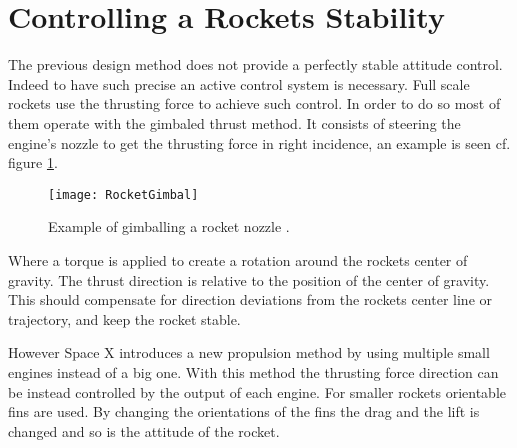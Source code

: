 \section{Controlling a Rockets Stability}
The previous design method does not provide a perfectly stable attitude control. Indeed to have such precise an active control system is necessary. Full scale rockets use the thrusting force to achieve such control. In order to do so most of them operate with the gimbaled thrust method. It consists of steering the engine's nozzle to get the thrusting force in right incidence, an example is seen cf. figure \ref{fig:RocketGimbal}. 
\begin{figure} [htbp]
	\centering
	\texttt{[image: RocketGimbal]}
	\caption{Example of gimballing a rocket nozzle \cite{web:rocketnasa}.}
	\label{fig:RocketGimbal}
\end{figure}

Where a torque is applied to create a rotation around the rockets center of gravity. The thrust direction is relative to the position of the center of gravity.  This should compensate for direction deviations from the rockets center line or trajectory, and keep the rocket stable.    	

However Space X introduces a new propulsion method by using multiple small engines instead of a big one. With this method the thrusting force direction can be instead controlled by the output of each engine. For smaller rockets orientable fins are used. By changing the orientations of the fins the drag and the lift is changed and so is the attitude of the rocket.


